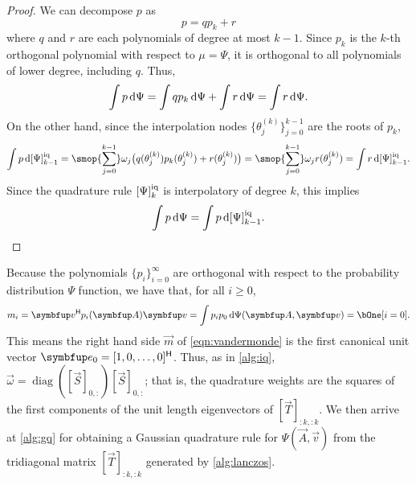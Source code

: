 \begin{proof}
We can decompose \( p \) as
\begin{equation*}
    p = q  p_k + r
\end{equation*}
where \( q \) and \( r \) are each polynomials of degree at most \( k-1 \).
Since \( p_k \) is the \( k \)-th orthogonal polynomial with respect to \( \mu = \Psi \), it is orthogonal to all polynomials of lower degree, including \( q \).
Thus,
\begin{equation*}
    \int p \,\textup{d}\Psi
    = \int q p_k \,\textup{d}\Psi + \int r\,\textup{d} \Psi
    = \int r \,\textup{d}\Psi.
\end{equation*}
    On the other hand, since the interpolation nodes \( \{\theta_j^{(k)}\}_{j=0}^{k-1} \) are the roots of  \( p_k \),
\begin{equation*}
    \int p \,\d\qq[i]{\Psi}{k-1}
    = \smop{\sum_{j=0}^{k-1}} \omega_{j} \big( q(\theta_{j}^{(k)} ) p_k(\theta_{j}^{(k)} ) + r(\theta_{j}^{(k)} )\big)
    = \smop{\sum_{j=0}^{k-1}} \omega_{j} r(\theta_{j}^{(k)} )
    = \int r \,\d\qq[i]{\Psi}{k-1}.
\end{equation*}
Since the quadrature rule \( \qq[i]{\Psi}{k} \) is interpolatory of degree \( k \), this implies
\begin{equation*}
    \int p \,\d\Psi
    = \int p \,\d\qq[i]{\Psi}{k-1}.
    \qedhere
\end{equation*}
\end{proof}

Because the polynomials \( \{ p_i \}_{i=0}^{\infty} \) are orthogonal with respect to the probability distribution \( \Psi \) function,
we have that, for all \( i\geq 0 \),
\begin{equation*}
    m_i = \vec{v}^\cT p_i(\vec{A})\vec{v} 
    =
    \int p_i p_0 \,\d\Psi(\vec{A},\vec{v})
    = \bOne[i=0].
\end{equation*}
This means the right hand side \( \vec{m} \) of \cref{eqn:vandermonde} is the first canonical unit vector \( \vec{e}_0 = [1,0,\ldots, 0]^\cT \).
Thus, as in \cref{alg:iq}, \( \vec{\omega} = \operatorname{diag}([\vec{S}]_{0,:}) [\vec{S}]_{0,:}\); that is, the quadrature weights are the squares of the first components of the unit length eigenvectors of \( [\vec{T}]_{:k,:k} \).
We then arrive at \cref{alg:gq} for obtaining a Gaussian quadrature rule for \( \Psi(\vec{A},\vec{v}) \) from the tridiagonal matrix \( [\vec{T}]_{:k,:k} \) generated by \cref{alg:lanczos}.

